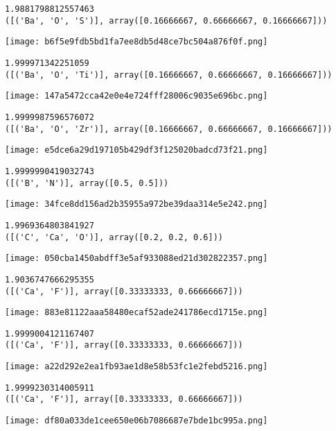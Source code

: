 \begin{lstlisting}
1.9881798812557463
([('Ba', 'O', 'S')], array([0.16666667, 0.66666667, 0.16666667]))
\end{lstlisting}

\texttt{[image: b6f5e9fdb5bd1fa7ee8db5d48ce7bc504a876f0f.png]}

\begin{lstlisting}
1.999971342251059
([('Ba', 'O', 'Ti')], array([0.16666667, 0.66666667, 0.16666667]))
\end{lstlisting}

\texttt{[image: 147a5472cca42e0e4e724fff28006c9035e696bc.png]}

\begin{lstlisting}
1.9999987596576072
([('Ba', 'O', 'Zr')], array([0.16666667, 0.66666667, 0.16666667]))
\end{lstlisting}

\texttt{[image: e5dce6a29d197105b429df3f125020badcd73f21.png]}

\begin{lstlisting}
1.9999990419032743
([('B', 'N')], array([0.5, 0.5]))
\end{lstlisting}

\texttt{[image: 34fce8dd156ad2b35955a972be39daa314e5e242.png]}

\begin{lstlisting}
1.9969364803841927
([('C', 'Ca', 'O')], array([0.2, 0.2, 0.6]))
\end{lstlisting}

\texttt{[image: 050cba1450abdff3e5af933088ed21d302822357.png]}

\begin{lstlisting}
1.9036747666295355
([('Ca', 'F')], array([0.33333333, 0.66666667]))
\end{lstlisting}

\texttt{[image: 883e81122aaa58480ecaf52ade241786ecd1715e.png]}

\begin{lstlisting}
1.9999004121167407
([('Ca', 'F')], array([0.33333333, 0.66666667]))
\end{lstlisting}

\texttt{[image: a22d292e2ea1fb93ae1d8e58b53fc1e2febd5216.png]}

\begin{lstlisting}
1.9999230314005911
([('Ca', 'F')], array([0.33333333, 0.66666667]))
\end{lstlisting}

\texttt{[image: df80a033de1cee650e06b7086687e7bde1bc995a.png]}

